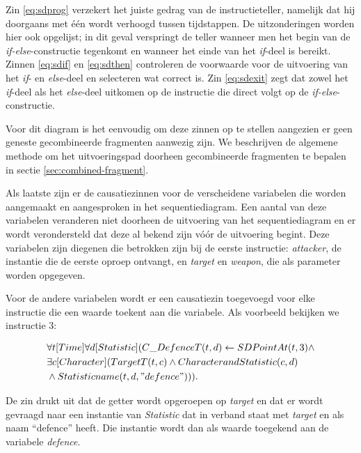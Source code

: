 Zin \ref{eq:sdprog} verzekert het juiste gedrag van de instructieteller, namelijk dat hij doorgaans met \'e\'en wordt verhoogd tussen tijdstappen. De uitzonderingen worden hier ook opgelijst; in dit geval verspringt de teller wanneer men het begin van de \textit{if-else}-constructie tegenkomt en wanneer het einde van het \textit{if}-deel is bereikt. Zinnen \ref{eq:sdif} en \ref{eq:sdthen} controleren de voorwaarde voor de uitvoering van het \textit{if}- en \textit{else}-deel en selecteren wat correct is. Zin \ref{eq:sdexit} zegt dat zowel het \textit{if}-deel als het \textit{else}-deel uitkomen op de instructie die direct volgt op de \textit{if-else}-constructie.

Voor dit diagram is het eenvoudig om deze zinnen op te stellen aangezien er geen geneste gecombineerde fragmenten aanwezig zijn. We beschrijven de algemene methode om het uitvoeringspad doorheen gecombineerde fragmenten te bepalen in sectie \ref{sec:combined-fragment}.

\parbreak

Als laatste zijn er de causatiezinnen voor de verscheidene variabelen die worden aangemaakt en aangesproken in het sequentiediagram. Een aantal van deze variabelen veranderen niet doorheen de uitvoering van het sequentiediagram en er wordt verondersteld dat deze al bekend zijn v\'o\'or de uitvoering begint. Deze variabelen zijn diegenen die betrokken zijn bij de eerste instructie: \textit{attacker}, de instantie die de eerste oproep ontvangt, en \textit{target} en \textit{weapon}, die als parameter worden opgegeven.

Voor de andere variabelen wordt er een causatiezin toegevoegd voor elke instructie die een waarde toekent aan die variabele. Als voorbeeld bekijken we instructie 3:

\begin{align*}
	&\forall{t}[Time]\forall{d}[Statistic](C\_DefenceT(t, d) \leftarrow SDPointAt(t, 3) \land \\ &\exists{c}[Character](TargetT(t, c) \land CharacterandStatistic(c, d) \\ &\land Statisticname(t, d, "defence"))).
\end{align*}


De zin drukt uit dat de getter wordt opgeroepen op \textit{target} en dat er wordt gevraagd naar een instantie van \textit{Statistic} dat in verband staat met \textit{target} en als naam ``defence'' heeft. Die instantie wordt dan als waarde toegekend aan de variabele \textit{defence}.

